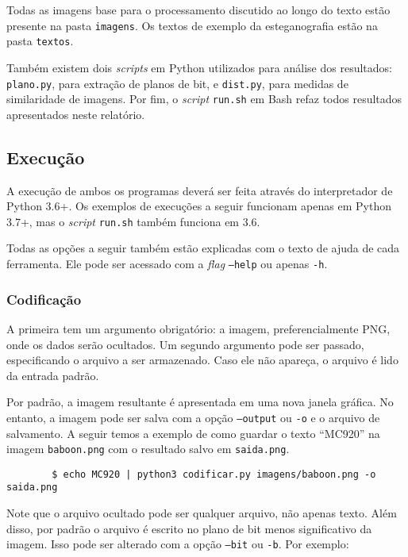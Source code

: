     Todas as imagens base para o processamento discutido ao longo do texto estão presente na pasta \texttt{imagens}. Os textos de exemplo da esteganografia estão na pasta \texttt{textos}.

    Também existem dois \textit{scripts} em Python utilizados para análise dos resultados: \texttt{plano.py}, para extração de planos de bit, e \texttt{dist.py}, para medidas de similaridade de imagens. Por fim, o \textit{script} \texttt{run.sh} em Bash refaz todos resultados apresentados neste relatório.

\subsection{Execução}

    A execução de ambos os programas deverá ser feita através do interpretador de Python 3.6+. Os exemplos de execuções a seguir funcionam apenas em Python 3.7+, mas o \textit{script} \texttt{run.sh} também funciona em 3.6.

    Todas as opções a seguir também estão explicadas com o texto de ajuda de cada ferramenta. Ele pode ser acessado com a \textit{flag} \texttt{--help} ou apenas \texttt{-h}.

    \subsubsection{Codificação}

    A primeira tem um argumento obrigatório: a imagem, preferencialmente PNG, onde os dados serão ocultados. Um segundo argumento pode ser passado, especificando o arquivo a ser armazenado. Caso ele não apareça, o arquivo é lido da entrada padrão.

    Por padrão, a imagem resultante é apresentada em uma nova janela gráfica. No entanto, a imagem pode ser salva com a opção \texttt{--output} ou \texttt{-o} e o arquivo de salvamento. A seguir temos a exemplo de como guardar o texto ``MC920'' na imagem \texttt{baboon.png} com o resultado salvo em \texttt{saida.png}.

    \begin{verbatim}
        $ echo MC920 | python3 codificar.py imagens/baboon.png -o saida.png
    \end{verbatim}

    Note que o arquivo ocultado pode ser qualquer arquivo, não apenas texto. Além disso, por padrão o arquivo é escrito no plano de bit menos significativo da imagem. Isso pode ser alterado com a opção \texttt{--bit} ou \texttt{-b}. Por exemplo:

